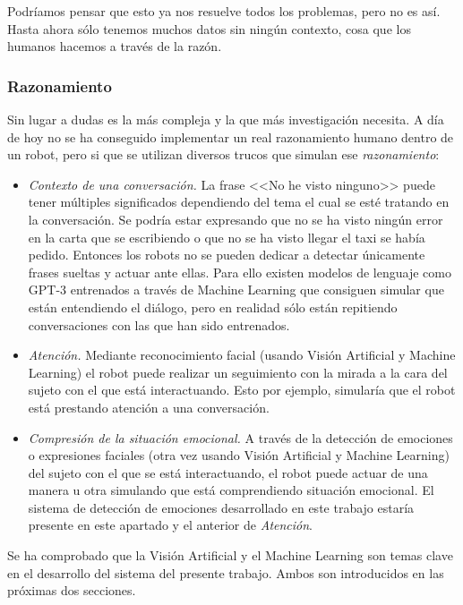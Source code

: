 Podríamos pensar que esto ya nos resuelve todos los problemas, pero no es así. Hasta ahora sólo tenemos muchos datos sin ningún contexto, cosa que los humanos hacemos a través de la razón.

\subsubsection{Razonamiento} 

Sin lugar a dudas es la más compleja y la que más investigación necesita. A día de hoy no se ha conseguido implementar un real razonamiento humano dentro de un robot, pero si que se utilizan diversos trucos que simulan ese \textit{razonamiento}:

\begin{itemize}
\item \textit{Contexto de una conversación.} La frase <<No he visto ninguno>> puede tener múltiples significados dependiendo del tema el cual se esté tratando en la conversación. Se podría estar expresando que no se ha visto ningún error en la carta que se escribiendo o que no se ha visto llegar el taxi se había pedido. Entonces los robots no se pueden dedicar a detectar únicamente frases sueltas y actuar ante ellas. Para ello existen modelos de lenguaje como GPT-3 entrenados a través de Machine Learning que consiguen simular que están entendiendo el diálogo, pero en realidad sólo están repitiendo conversaciones con las que han sido entrenados.

\item \textit{Atención.} Mediante reconocimiento facial (usando Visión Artificial y Machine Learning) el robot puede realizar un seguimiento con la mirada a la cara del sujeto con el que está interactuando. Esto por ejemplo, simularía que el robot está prestando atención a una conversación.

\item \textit{Compresión de la situación emocional.} A través de la detección de emociones o expresiones faciales (otra vez usando Visión Artificial y Machine Learning) del sujeto con el que se está interactuando, el robot puede actuar de una manera u otra simulando que está comprendiendo situación emocional. El sistema de detección de emociones desarrollado en este trabajo estaría presente en este apartado y el anterior de \textit{Atención}.
\end{itemize}

Se ha comprobado que la Visión Artificial y el Machine Learning son temas clave en el desarrollo del sistema del presente trabajo. Ambos son introducidos en las próximas dos secciones.

